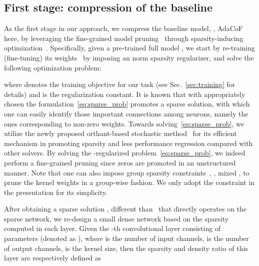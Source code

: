 \documentclass[final]{cvpr}
\begin{document}
\subsection{First stage: compression of the baseline}\label{sec:compression}

As the first stage in our approach, we compress the baseline model, \ie, AdaCoF here, by leveraging the fine-grained model pruning~\cite{zhu2017prune} through sparsity-inducing optimization~\cite{chen2018fast}. Specifically, given a pre-trained full model , we start by re-training (fine-tuning) its weights~ by imposing an  norm sparsity regularizer, and solve the following optimization problem:

where  denotes the training objective for our task (see Sec.~\ref{sec:training} for details) and  is the regularization constant. It is known that with appropriately chosen  the formulation~\eqref{eq:sparse_prob} promotes a sparse solution, with which one can easily identify those important connections among neurons, namely the ones corresponding to non-zero weights. Towards solving~\eqref{eq:sparse_prob}, we utilize the newly proposed orthant-based stochastic method~\cite{chen2020orthant} for its efficient mechanism in promoting sparsity and less performance regression compared with other solvers. By solving the -regularized problem~\eqref{eq:sparse_prob}, we indeed perform a fine-grained pruning since zeros are promoted in an unstructured manner. Note that one can also impose group sparsity constraints~\cite{chen2020half,lebedev2016fast,zhou2016less}, \eg, mixed , to prune the kernel weights in a group-wise fashion. We only adopt the  
constraint in the presentation for its simplicity.

After obtaining a sparse solution , different than~\cite{han2015learning} that directly operates on the sparse network, we re-design a small dense network  based on the sparsity computed in each layer. Given the -th convolutional layer consisting of  parameters (denoted as ), where  is the number of input channels,  is the number of output channels,  is the kernel size, then the sparsity  and density ratio  of this layer are respectively defined as 

\vspace{-0.2in}
\end{document}
